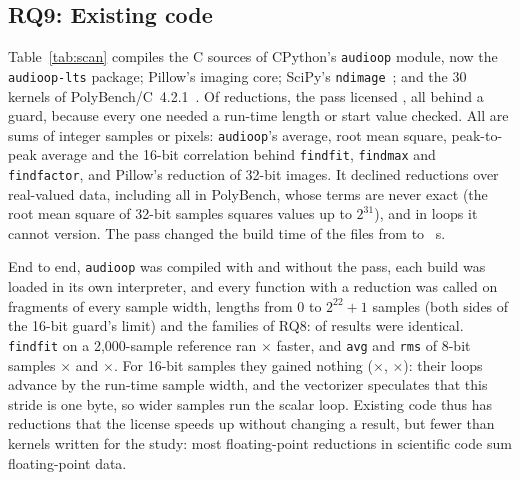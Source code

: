 \documentclass[acmsmall,review,anonymous,nonacm]{acmart}
\begin{document}
\subsection{RQ9: Existing code}\label{sec:rq9}
\begin{table}[t]
\caption{RQ9 on M2. Floating-point add reductions that LLVM recognizes in four
existing code bases, compiled with \texttt{clang -O3 -march=native} and
ExactReduce, and why the declined ones were declined: no grid fact (real-valued
data), a term or sum that is never exact, or a loop the pass cannot version.}
\label{tab:scan}\centering\footnotesize
\end{table}
Table~\ref{tab:scan} compiles the C sources of CPython's \texttt{audioop}
module, now the \texttt{audioop-lts} package; Pillow's imaging core; SciPy's
\texttt{ndimage}~\cite{scipy}; and the 30 kernels of
PolyBench/C~4.2.1~\cite{polybench}. Of \LlvmScanReductions{} reductions, the
pass licensed \LlvmScanVersioned{}, all behind a guard, because every one needed
a run-time length or start value checked. All are sums of integer samples or
pixels: \texttt{audioop}'s average, root mean square, peak-to-peak average and
the 16-bit correlation behind \texttt{findfit}, \texttt{findmax} and
\texttt{findfactor}, and Pillow's reduction of 32-bit images. It declined
\LlvmScanNoFact{} reductions over real-valued data, including all
\LlvmScanPolybenchReductions{} in PolyBench, \LlvmScanInexact{} whose terms are
never exact (the root mean square of 32-bit samples squares values up to
$2^{31}$), and \LlvmScanShape{} in loops it cannot version. The pass changed
the build time of the \LlvmScanCompiled{} files from \LlvmScanCompileWithoutS{}
to \LlvmScanCompileWithS~s.

End to end, \texttt{audioop} was compiled with and without the pass, each build
was loaded in its own interpreter, and every function with a reduction was
called on fragments of every sample width, lengths from 0 to $2^{22}+1$
samples (both sides of the 16-bit guard's limit) and the families of RQ8:
\LlvmAudioopIdentical{} of \LlvmAudioopResults{} results were identical.
\texttt{findfit} on a 2,000-sample reference ran
\LlvmAudioopFindfitSixteen$\times$ faster, and \texttt{avg} and \texttt{rms} of
8-bit samples \LlvmAudioopAvgEight$\times$ and \LlvmAudioopRmsEight$\times$.
For 16-bit samples they gained nothing (\LlvmAudioopAvgSixteen$\times$,
\LlvmAudioopRmsSixteen$\times$): their loops advance by the run-time sample
width, and the vectorizer speculates that this stride is one byte, so wider
samples run the scalar loop. Existing code thus has reductions that the license
speeds up without changing a result, but fewer than kernels written for the
study: most floating-point reductions in scientific code sum floating-point
data.
\end{document}
